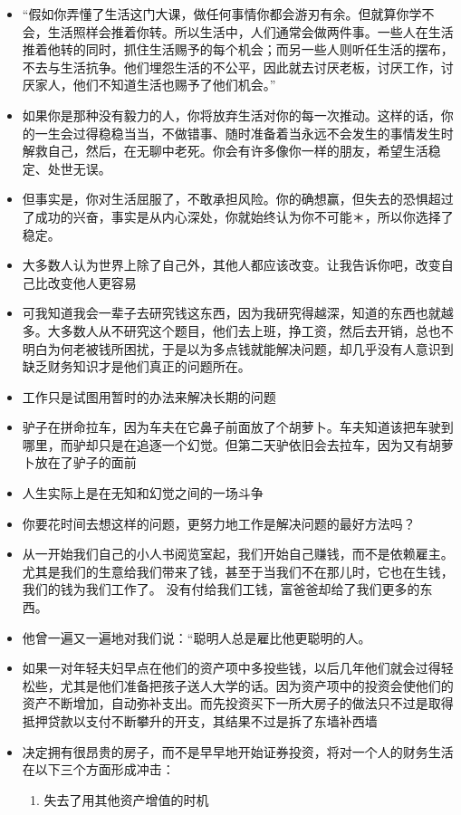 \documentclass[UTF8,a4paper,8pt]{ctexart}
\begin{document}
\begin{itemize}
 	\item “假如你弄懂了生活这门大课，做任何事情你都会游刃有余。但就算你学不会，生活照样会推着你转。所以生活中，人们通常会做两件事。一些人在生活推着他转的同时，抓住生活赐予的每个机会；而另一些人则听任生活的摆布，不去与生活抗争。他们埋怨生活的不公平，因此就去讨厌老板，讨厌工作，讨厌家人，他们不知道生活也赐予了他们机会。”
 	\item 如果你是那种没有毅力的人，你将放弃生活对你的每一次推动。这样的话，你的一生会过得稳稳当当，不做错事、随时准备着当永远不会发生的事情发生时解救自己，然后，在无聊中老死。你会有许多像你一样的朋友，希望生活稳定、处世无误。
 	\item 但事实是，你对生活屈服了，不敢承担风险。你的确想赢，但失去的恐惧超过了成功的兴奋，事实是从内心深处，你就始终认为你不可能＊，所以你选择了稳定。
 	\item 大多数人认为世界上除了自己外，其他人都应该改变。让我告诉你吧，改变自己比改变他人更容易
 	\item 可我知道我会一辈子去研究钱这东西，因为我研究得越深，知道的东西也就越多。大多数人从不研究这个题目，他们去上班，挣工资，然后去开销，总也不明白为何老被钱所困扰，于是以为多点钱就能解决问题，却几乎没有人意识到缺乏财务知识才是他们真正的问题所在。
 	\item 工作只是试图用暂时的办法来解决长期的问题
 	\item 驴子在拼命拉车，因为车夫在它鼻子前面放了个胡萝卜。车夫知道该把车驶到哪里，而驴却只是在追逐一个幻觉。但第二天驴依旧会去拉车，因为又有胡萝卜放在了驴子的面前
 	\item 人生实际上是在无知和幻觉之间的一场斗争
 	\item 你要花时间去想这样的问题，更努力地工作是解决问题的最好方法吗？
 	\item 从一开始我们自己的小人书阅览室起，我们开始自己赚钱，而不是依赖雇主。尤其是我们的生意给我们带来了钱，甚至于当我们不在那儿时，它也在生钱，我们的钱为我们工作了。 没有付给我们工钱，富爸爸却给了我们更多的东西。
 	\item 他曾一遍又一遍地对我们说：“聪明人总是雇比他更聪明的人。
 	\item 如果一对年轻夫妇早点在他们的资产项中多投些钱，以后几年他们就会过得轻松些，尤其是他们准备把孩子送人大学的话。因为资产项中的投资会使他们的资产不断增加，自动弥补支出。而先投资买下一所大房子的做法只不过是取得抵押贷款以支付不断攀升的开支，其结果不过是拆了东墙补西墙
 	\item 决定拥有很昂贵的房子，而不是早早地开始证券投资，将对一个人的财务生活在以下三个方面形成冲击：
 	\begin{enumerate}
 		\item 失去了用其他资产增值的时机

\end{enumerate}
\end{itemize}
\end{document}
